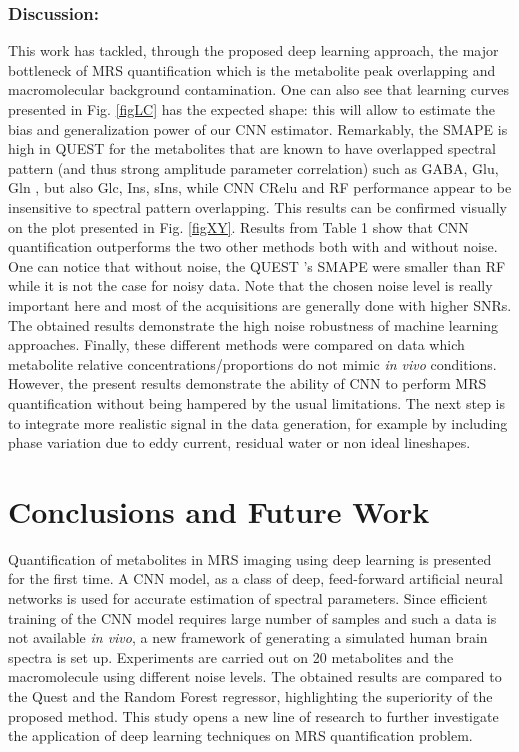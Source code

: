 \documentclass{llncs}
\begin{document}
\subsubsection{Discussion:}
This work has  tackled, through the proposed deep learning approach, the major bottleneck of MRS quantification which is the metabolite peak overlapping and macromolecular background contamination.
One can also see that learning curves presented in Fig. \ref{figLC} has the expected shape: this will allow to 
estimate the bias and generalization power of our CNN estimator.
Remarkably, the SMAPE is high in QUEST for the metabolites that are known to have overlapped spectral pattern (and thus strong amplitude parameter correlation) such as GABA, Glu, Gln , but also Glc, Ins, sIns,  while CNN CRelu and RF performance appear to be insensitive to spectral pattern overlapping. This results can be confirmed visually on the plot presented in Fig. \ref{figXY}.
%
%
Results from Table 1 show that CNN quantification outperforms the two other methods both with and without noise.
One can notice that without noise, the QUEST 's SMAPE were smaller than RF while it is not the case for noisy data. Note that the chosen noise level is really important here and most of the acquisitions are generally done with higher SNRs. The obtained results demonstrate the high noise robustness of machine learning approaches. Finally, these different methods were compared on data which metabolite relative concentrations/proportions do not mimic \textit{in vivo} conditions. However, the present results demonstrate the ability of CNN to perform MRS quantification without being hampered by the usual limitations. 
The next step is to integrate more realistic signal in the data generation, for example by including phase variation due to eddy current, residual water or non ideal lineshapes.

\section{Conclusions and Future Work}
Quantification of metabolites in MRS imaging using deep learning is presented for the first time. A CNN model, as a class of deep, feed-forward artificial neural networks is used for accurate estimation of spectral parameters. Since efficient training of the CNN model requires large number of samples and such a data is not available  \textit{in vivo}, a new framework of generating a simulated human brain spectra is set up. Experiments are carried out on 20 metabolites and the macromolecule using different noise levels. The obtained results are compared to the Quest and the Random Forest regressor, highlighting the superiority of the proposed method. This study opens a new line of research to further investigate the application of deep learning techniques on MRS quantification problem.
\end{document}

